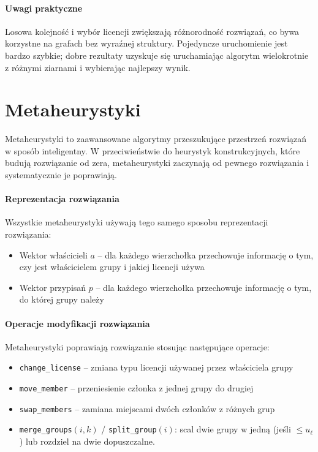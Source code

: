 \paragraph{Uwagi praktyczne}
Losowa kolejność i wybór licencji zwiększają różnorodność rozwiązań, co bywa korzystne na grafach bez wyraźnej struktury. Pojedyncze uruchomienie jest bardzo szybkie; dobre rezultaty uzyskuje się uruchamiając algorytm wielokrotnie z różnymi ziarnami i wybierając najlepszy wynik.

\section{Metaheurystyki}

Metaheurystyki to zaawansowane algorytmy przeszukujące przestrzeń rozwiązań w sposób inteligentny. W przeciwieństwie do heurystyk konstrukcyjnych, które budują rozwiązanie od zera, metaheurystyki zaczynają od pewnego rozwiązania i systematycznie je poprawiają.

\paragraph{Reprezentacja rozwiązania}
Wszystkie metaheurystyki używają tego samego sposobu reprezentacji rozwiązania:
\begin{itemize}
  \item Wektor właścicieli $a$ -- dla każdego wierzchołka przechowuje informację o tym, czy jest właścicielem grupy i jakiej licencji używa
  \item Wektor przypisań $p$ -- dla każdego wierzchołka przechowuje informację o tym, do której grupy należy
\end{itemize}

\paragraph{Operacje modyfikacji rozwiązania}
Metaheurystyki poprawiają rozwiązanie stosując następujące operacje:
\begin{itemize}
  \item \texttt{change\_license} -- zmiana typu licencji używanej przez właściciela grupy
  \item \texttt{move\_member} -- przeniesienie członka z jednej grupy do drugiej
  \item \texttt{swap\_members} -- zamiana miejscami dwóch członków z różnych grup
  \item \texttt{merge\_groups}$(i,k)$ / \texttt{split\_group}$(i)$: scal dwie grupy w jedną (jeśli $\le u_\ell$) lub rozdziel na dwie dopuszczalne.
\end{itemize}

